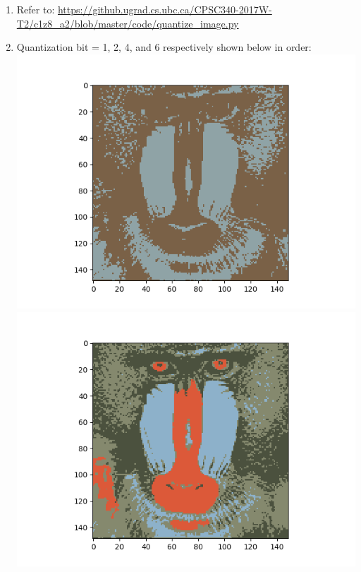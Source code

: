 \documentclass{article}
\def\enum#1{\begin{enumerate}#1\end{enumerate}}
\begin{document}
{\enum{
\item Refer to: \url{https://github.ugrad.cs.ubc.ca/CPSC340-2017W-T2/c1z8_a2/blob/master/code/quantize_image.py}
\item Quantization bit = 1, 2, 4, and 6 respectively shown below in order: \\
 \includegraphics[scale=0.6]{../figs/b_1_image.png} \\
 \includegraphics[scale=0.6]{../figs/b_2_image.png} \\
}}
\end{document}
